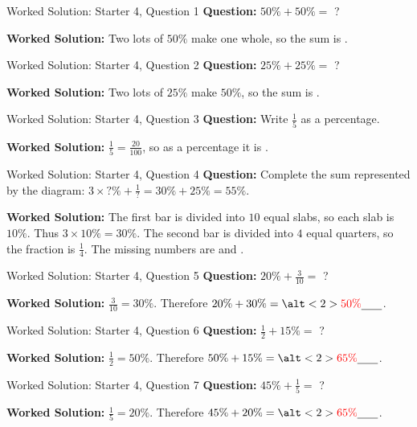 \documentclass{beamer}
\newcommand{\ablank}[1]{%
  \alt<2>{\textcolor{red}{#1}}{\underline{\phantom{#1}}}%
}
\begin{document}
\begin{frame}[t]{Worked Solution: Starter 4, Question 1}
\hypertarget{work-st4}{}
\textbf{Question:} \(50\% + 50\% =\) ?

\smallskip
\textbf{Worked Solution:} Two lots of \(50\%\) make one whole, so the sum is \ablank{$100\%$}.
\end{frame}

\begin{frame}[t]{Worked Solution: Starter 4, Question 2}
\textbf{Question:} \(25\% + 25\% =\) ?

\smallskip
\textbf{Worked Solution:} Two lots of \(25\%\) make \(50\%\), so the sum is \ablank{$50\%$}.
\end{frame}

\begin{frame}[t]{Worked Solution: Starter 4, Question 3}
\textbf{Question:} Write \(\frac{1}{5}\) as a percentage.

\smallskip
\textbf{Worked Solution:} \(\frac{1}{5} = \frac{20}{100}\), so as a percentage it is \ablank{$20\%$}.
\end{frame}

\begin{frame}[t]{Worked Solution: Starter 4, Question 4}
\textbf{Question:} Complete the sum represented by the diagram: \(3 \times ?\% + \frac{1}{?} = 30\% + 25\% = 55\%\).

\smallskip
\textbf{Worked Solution:} The first bar is divided into \(10\) equal slabs, so each slab is \(10\%\). Thus \(3 \times 10\% = 30\%\). The second bar is divided into \(4\) equal quarters, so the fraction is \(\frac{1}{4}\). The missing numbers are \ablank{$10$} and \ablank{$4$}.
\end{frame}

\begin{frame}[t]{Worked Solution: Starter 4, Question 5}
\textbf{Question:} \(20\% + \frac{3}{10} =\) ?

\smallskip
\textbf{Worked Solution:} \(\frac{3}{10} = 30\%\). Therefore \(20\% + 30\% = \ablank{50\%}\).
\end{frame}

\begin{frame}[t]{Worked Solution: Starter 4, Question 6}
\textbf{Question:} \(\frac{1}{2} + 15\% =\) ?

\smallskip
\textbf{Worked Solution:} \(\frac{1}{2} = 50\%\). Therefore \(50\% + 15\% = \ablank{65\%}\).
\end{frame}

\begin{frame}[t]{Worked Solution: Starter 4, Question 7}
\textbf{Question:} \(45\% + \frac{1}{5} =\) ?

\smallskip
\textbf{Worked Solution:} \(\frac{1}{5} = 20\%\). Therefore \(45\% + 20\% = \ablank{65\%}\).
\end{frame}
\end{document}
